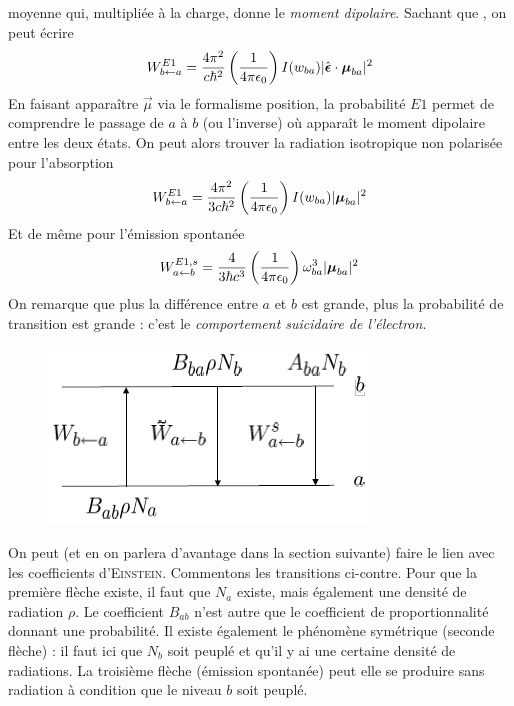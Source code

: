 moyenne qui, multipliée à la charge, donne le \textit{moment dipolaire}. Sachant que
$ $, on peut écrire
\begin{equation}
W^{E1}_{b \leftarrow a} = \frac{4 \pi^2}{c \hbar^2} \left( \frac{1}{4 \pi \epsilon_0 } \right)
 I(w_{ba}) \vert  \hat{  \mbox{\boldmath $ \epsilon $}} \cdot 
 \mbox{\boldmath $ \mu $}_{ba} \vert ^2
\end{equation}
En faisant apparaître $\vec\mu$ via le formalisme position, la probabilité $E1$ permet de comprendre
le passage de $a$ à $b$ (ou l'inverse) où apparaît le moment dipolaire entre les deux états. On peut
alors trouver la radiation isotropique non polarisée pour l'absorption
\begin{equation}
W^{E1}_{b \leftarrow a} = \frac{4 \pi^2}{3 c \hbar^2} \left( \frac{1}{4 \pi \epsilon_0 } \right)
 I(w_{ba}) \vert  
 \mbox{\boldmath $ \mu $}_{ba} \vert ^2
\end{equation}
Et de même pour l'émission spontanée
\begin{equation}
W_{a \leftarrow b}^{E1,s} = \frac{4}{3 \hbar c^3} \left( \frac{1}{4 \pi \epsilon_0} \right)
  \omega_{b a}^3 \vert  \mbox{\boldmath $ \mu $}_{ba} \vert ^2
\end{equation}
On remarque que plus la différence entre $a$ et $b$ est grande, plus la probabilité de transition
est grande : c'est le \textit{comportement suicidaire de l'électron}.\\


	\begin{figure}
	\vspace{-5mm}
	\includegraphics[scale=0.6]{ch2/image2}
	\end{figure}
On peut (et en on parlera d'avantage dans la section suivante) faire le lien avec les coefficients
d'\textsc{Einstein}. Commentons les transitions ci-contre. Pour que la première flèche existe, il
faut que $N_a$ existe, mais également une densité de radiation $\rho$. Le coefficient $B_{ab}$ n'est
autre que le coefficient de proportionnalité donnant une probabilité. Il existe également le 
phénomène symétrique (seconde flèche) : il faut ici que $N_b$ soit peuplé et qu'il y ai une certaine
densité de radiations. La troisième flèche (émission spontanée) peut elle se produire sans radiation
à condition que le niveau $b$ soit peuplé.


